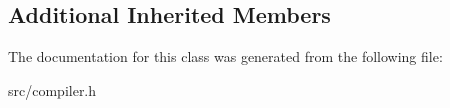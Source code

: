 \subsection*{Additional Inherited Members}


The documentation for this class was generated from the following file\+:\begin{DoxyCompactItemize}
\item 
src/compiler.\+h\end{DoxyCompactItemize}
